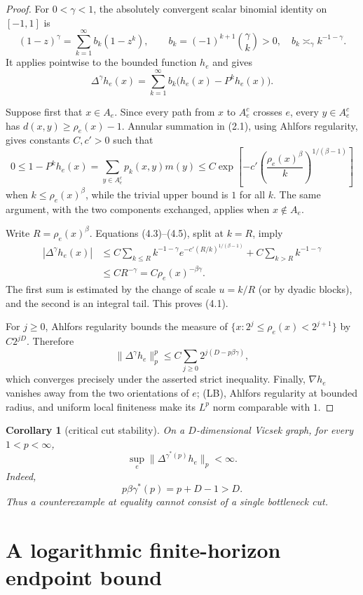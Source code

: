 \documentclass[11pt]{article}
\newtheorem{corollary}[theorem]{Corollary}
\theoremstyle{remark}
\begin{document}
\begin{proof}
For $0<\gamma<1$, the absolutely convergent scalar binomial identity on
$[-1,1]$ is
\[
 (1-z)^\gamma=\sum_{k=1}^\infty b_k(1-z^k),\qquad
 b_k=(-1)^{k+1}\binom{\gamma}{k}>0,
 \quad b_k\asymp_\gamma k^{-1-\gamma}.
 \tag{4.3}
\]
It applies pointwise to the bounded function $h_e$ and gives
\[
 \Delta^\gamma h_e(x)=\sum_{k=1}^\infty
 b_k\bigl(h_e(x)-P^kh_e(x)\bigr).
 \tag{4.4}
\]

Suppose first that $x\in A_e$.  Since every path from $x$ to $A_e^c$ crosses
$e$, every $y\in A_e^c$ has $d(x,y)\geq \rho_e(x)-1$.  Annular summation in
(2.1), using Ahlfors regularity, gives constants $C,c'>0$ such that
\[
 0\leq 1-P^kh_e(x)
 =\sum_{y\in A_e^c}p_k(x,y)m(y)
 \leq C\exp\!\left[-c'
 \left(\frac{\rho_e(x)^\beta}{k}\right)^{1/(\beta-1)}\right]
 \tag{4.5}
\]
when $k\leq\rho_e(x)^\beta$, while the trivial upper bound is $1$ for all
$k$.  The same argument, with the two components exchanged, applies when
$x\notin A_e$.

Write $R=\rho_e(x)^\beta$.  Equations (4.3)--(4.5), split at $k=R$, imply
\begin{align*}
 |\Delta^\gamma h_e(x)|
 &\leq C\sum_{k\leq R} k^{-1-\gamma}
     e^{-c'(R/k)^{1/(\beta-1)}}
   +C\sum_{k>R}k^{-1-\gamma}\\
 &\leq C R^{-\gamma}=C\rho_e(x)^{-\beta\gamma}.
\end{align*}
The first sum is estimated by the change of scale $u=k/R$ (or by dyadic
blocks), and the second is an integral tail.  This proves (4.1).

For $j\geq0$, Ahlfors regularity bounds the measure of
$\{x:2^j\leq\rho_e(x)<2^{j+1}\}$ by $C2^{jD}$.  Therefore
\[
 \|\Delta^\gamma h_e\|_p^p
 \leq C\sum_{j\geq0}2^{j(D-p\beta\gamma)},
\]
which converges precisely under the asserted strict inequality.  Finally,
$\nabla h_e$ vanishes away from the two orientations of $e$; (LB), Ahlfors
regularity at bounded radius, and uniform local finiteness make its $L^p$
norm comparable with $1$.
\end{proof}

\begin{corollary}[critical cut stability]\label{cor:critical}
On a $D$-dimensional Vicsek graph, for every $1<p<\infty$,
\[
 \sup_e\|\Delta^{\gamma^*(p)}h_e\|_p<\infty.
\]
Indeed,
\[
 p\beta\gamma^*(p)=p+D-1>D.
\]
Thus a counterexample at equality cannot consist of a single bottleneck cut.
\end{corollary}

\section{A logarithmic finite-horizon endpoint bound}
\end{document}
